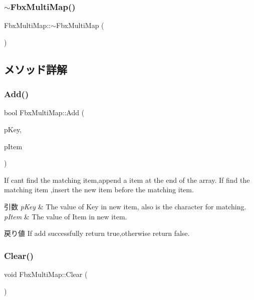\subsubsection{\texorpdfstring{$\sim$\+Fbx\+Multi\+Map()}{~FbxMultiMap()}}
{\footnotesize\ttfamily Fbx\+Multi\+Map\+::$\sim$\+Fbx\+Multi\+Map (\begin{DoxyParamCaption}{ }\end{DoxyParamCaption})}



\subsection{メソッド詳解}
\mbox{\label{class_fbx_multi_map_af2a311d7518a76cf06ac5f2ce84d597a}} 
\subsubsection{\texorpdfstring{Add()}{Add()}}
{\footnotesize\ttfamily bool Fbx\+Multi\+Map\+::\+Add (\begin{DoxyParamCaption}\item[{Fbx\+Handle}]{p\+Key,  }\item[{Fbx\+Handle}]{p\+Item }\end{DoxyParamCaption})}

If can\textquotesingle{}t find the matching item,append a item at the end of the array. If find the matching item ,insert the new item before the matching item. 
\begin{DoxyParams}{引数}
{\em p\+Key} & The value of Key in new item, also is the character for matching. \\
\hline
{\em p\+Item} & The value of Item in new item. \\
\hline
\end{DoxyParams}
\begin{DoxyReturn}{戻り値}
If add successfully return true,otherwise return false. 
\end{DoxyReturn}
\mbox{\label{class_fbx_multi_map_add121708bf4b592eecf823eee98ed841}} 
\subsubsection{\texorpdfstring{Clear()}{Clear()}}
{\footnotesize\ttfamily void Fbx\+Multi\+Map\+::\+Clear (\begin{DoxyParamCaption}{ }\end{DoxyParamCaption})}



